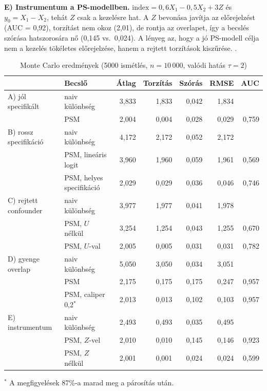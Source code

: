 \documentclass[11pt,a4paper]{article}
\begin{document}
\textbf{E) Instrumentum a PS-modellben.} $\text{index} = 0{,}6X_1 - 0{,}5X_2 + 3Z$ és
$y_0 = X_1 - X_2$, tehát $Z$ csak a kezelésre hat. A $Z$ bevonása javítja az előrejelzést
(AUC = 0,92), torzítást nem okoz (2,01), de rontja az overlapet, így a becslés szórása hatszorosára nő
(0,145 vs.\ 0,024). A lényeg az, hogy a jó PS-modell célja nem a kezelés tökéletes előrejelzése, hanem a rejtett torzítások kiszűrése. \cite{brookhart2006}.

\begin{table}[htbp]
\centering\small
\caption{Monte Carlo eredmények (5000 ismétlés, $n = 10\,000$, valódi hatás $\tau = 2$)}
\begin{tabular}{llrrrrr}
\toprule
 & Becslő & Átlag & Torzítás & Szórás & RMSE & AUC \\
\midrule
A) jól specifikált    & naiv különbség           & 3,833 & 1,833 & 0,042 & 1,834 &       \\
                      & PSM                      & 2,004 & 0,004 & 0,028 & 0,029 & 0,759 \\
\addlinespace
B) rossz specifikáció & naiv különbség           & 4,172 & 2,172 & 0,052 & 2,172 &       \\
                      & PSM, lineáris logit      & 3,960 & 1,960 & 0,059 & 1,961 & 0,569 \\
                      & PSM, helyes specifikáció & 2,029 & 0,029 & 0,036 & 0,046 & 0,746 \\
\addlinespace
C) rejtett confounder & naiv különbség           & 3,977 & 1,977 & 0,041 & 1,978 &       \\
                      & PSM, $U$ nélkül          & 3,254 & 1,254 & 0,043 & 1,255 & 0,670 \\
                      & PSM, $U$-val             & 2,005 & 0,005 & 0,031 & 0,031 & 0,782 \\
\addlinespace
D) gyenge overlap     & naiv különbség           & 5,050 & 3,050 & 0,034 & 3,051 &       \\
                      & PSM                      & 2,175 & 0,175 & 0,175 & 0,247 & 0,957 \\
                      & PSM, caliper 0,2$^{*}$   & 2,013 & 0,013 & 0,102 & 0,103 & 0,957 \\
\addlinespace
E) instrumentum       & naiv különbség           & 2,493 & 0,493 & 0,035 & 0,495 &       \\
                      & PSM, $Z$-vel             & 2,010 & 0,010 & 0,145 & 0,146 & 0,923 \\
                      & PSM, $Z$ nélkül          & 2,001 & 0,001 & 0,024 & 0,024 & 0,599 \\
\bottomrule
\end{tabular}

\smallskip
\footnotesize $^{*}$ A megfigyelések 87\%-a marad meg a párosítás után.
\end{table}
\end{document}
